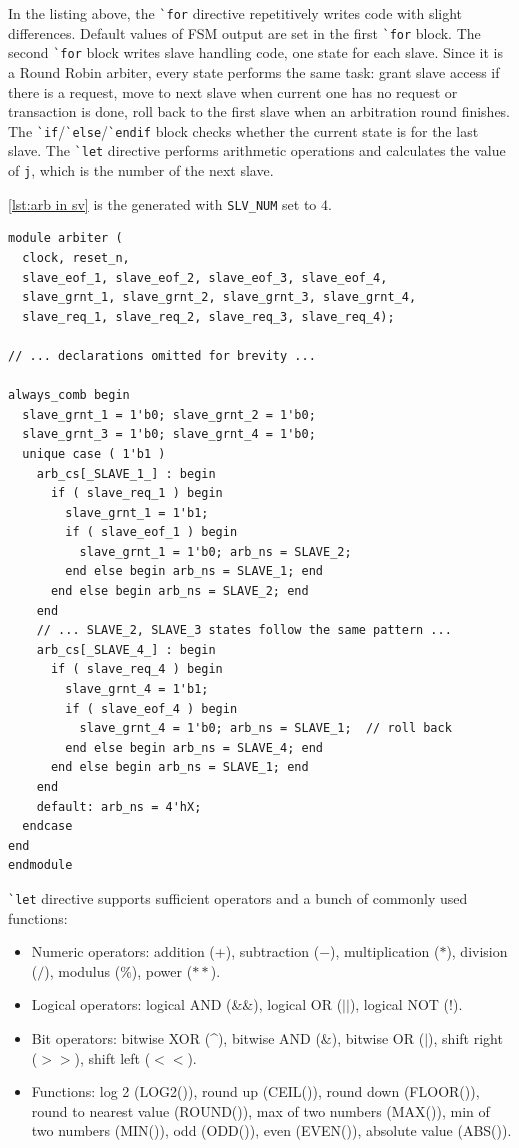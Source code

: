 In the listing above, the \texttt{\`{}for} directive repetitively writes code with
slight differences. Default values of FSM output are set in the first \texttt{\`{}for} block.
The second \texttt{\`{}for} block writes slave handling code, one state for each slave.
Since it is a Round Robin arbiter, every state performs the same task: grant slave access if
there is a request, move to next slave when current one has no request or transaction is done,
roll back to the first slave when an arbitration round finishes.
The \texttt{\`{}if}/\texttt{\`{}else}/\texttt{\`{}endif} block checks whether the current state
is for the last slave.
The \texttt{\`{}let} directive performs arithmetic operations and calculates the value of
\texttt{j}, which is the number of the next slave.

\autoref{lst:arb in sv} is the generated \sv{} with \texttt{SLV\_NUM} set to $4$.

\begin{lstlisting}[caption={Generated 4-slave arbiter \sv{} code}, label={lst:arb in sv}]
module arbiter (
  clock, reset_n,
  slave_eof_1, slave_eof_2, slave_eof_3, slave_eof_4,
  slave_grnt_1, slave_grnt_2, slave_grnt_3, slave_grnt_4,
  slave_req_1, slave_req_2, slave_req_3, slave_req_4);

// ... declarations omitted for brevity ...

always_comb begin
  slave_grnt_1 = 1'b0; slave_grnt_2 = 1'b0;
  slave_grnt_3 = 1'b0; slave_grnt_4 = 1'b0;
  unique case ( 1'b1 )
    arb_cs[_SLAVE_1_] : begin
      if ( slave_req_1 ) begin
        slave_grnt_1 = 1'b1;
        if ( slave_eof_1 ) begin
          slave_grnt_1 = 1'b0; arb_ns = SLAVE_2;
        end else begin arb_ns = SLAVE_1; end
      end else begin arb_ns = SLAVE_2; end
    end
    // ... SLAVE_2, SLAVE_3 states follow the same pattern ...
    arb_cs[_SLAVE_4_] : begin
      if ( slave_req_4 ) begin
        slave_grnt_4 = 1'b1;
        if ( slave_eof_4 ) begin
          slave_grnt_4 = 1'b0; arb_ns = SLAVE_1;  // roll back
        end else begin arb_ns = SLAVE_4; end
      end else begin arb_ns = SLAVE_1; end
    end
    default: arb_ns = 4'hX;
  endcase
end
endmodule
\end{lstlisting}


\texttt{\`{}let} directive supports sufficient operators and a bunch of commonly used functions:
\begin{itemize}
\item Numeric operators: addition (+), subtraction ($-$),  multiplication ($*$), division ($/$),
modulus (\%), power ($**$).
\item Logical operators: logical AND (\&\&), logical OR ($||$), logical NOT ($!$).
\item Bit operators: bitwise XOR (\^{}), bitwise AND  (\&),  bitwise OR ($|$),
shift right ($>>$), shift left ($<<$).
\item Functions: log 2 (LOG2()), round up (CEIL()), round down (FLOOR()),
round to nearest value (ROUND()),  max of two numbers (MAX()),
min of two numbers (MIN()), odd (ODD()), even (EVEN()), absolute value (ABS()).
\end{itemize}

